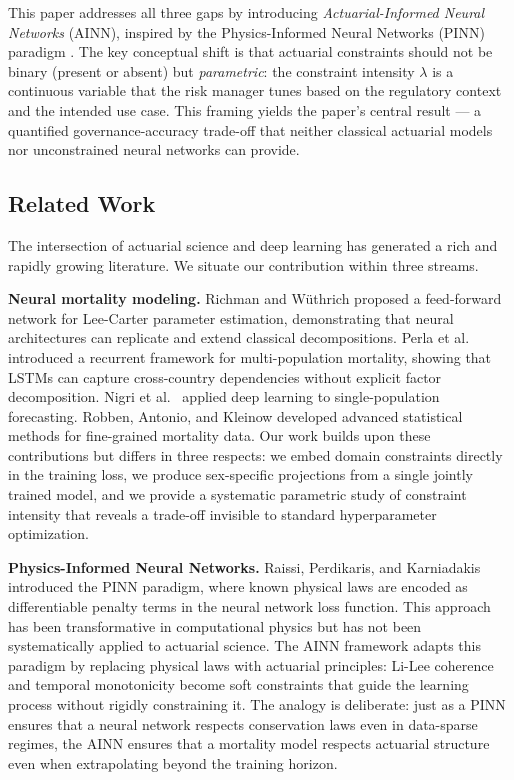 \documentclass[11pt,a4paper]{article}
\begin{document}
This paper addresses all three gaps by introducing \textit{Actuarial-Informed Neural Networks} (AINN), inspired by the Physics-Informed Neural Networks (PINN) paradigm \cite{raissi2019pinn}. The key conceptual shift is that actuarial constraints should not be binary (present or absent) but \textit{parametric}: the constraint intensity $\lambda$ is a continuous variable that the risk manager tunes based on the regulatory context and the intended use case. This framing yields the paper's central result --- a quantified governance-accuracy trade-off that neither classical actuarial models nor unconstrained neural networks can provide.

\subsection{Related Work}

The intersection of actuarial science and deep learning has generated a rich and rapidly growing literature. We situate our contribution within three streams.

\textbf{Neural mortality modeling.} Richman and W\"uthrich \cite{richman2021} proposed a feed-forward network for Lee-Carter parameter estimation, demonstrating that neural architectures can replicate and extend classical decompositions. Perla et al.\ \cite{perla2021} introduced a recurrent framework for multi-population mortality, showing that LSTMs can capture cross-country dependencies without explicit factor decomposition. Nigri et al.\ \cite{nigri2019} applied deep learning to single-population forecasting. Robben, Antonio, and Kleinow \cite{robben2025} developed advanced statistical methods for fine-grained mortality data. Our work builds upon these contributions but differs in three respects: we embed domain constraints directly in the training loss, we produce sex-specific projections from a single jointly trained model, and we provide a systematic parametric study of constraint intensity that reveals a trade-off invisible to standard hyperparameter optimization.

\textbf{Physics-Informed Neural Networks.} Raissi, Perdikaris, and Karniadakis \cite{raissi2019pinn} introduced the PINN paradigm, where known physical laws are encoded as differentiable penalty terms in the neural network loss function. This approach has been transformative in computational physics but has not been systematically applied to actuarial science. The AINN framework adapts this paradigm by replacing physical laws with actuarial principles: Li-Lee coherence and temporal monotonicity become soft constraints that guide the learning process without rigidly constraining it. The analogy is deliberate: just as a PINN ensures that a neural network respects conservation laws even in data-sparse regimes, the AINN ensures that a mortality model respects actuarial structure even when extrapolating beyond the training horizon.
\end{document}
